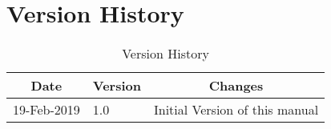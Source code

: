 \newpage
\thispagestyle{plain}
\section*{Version History}
\begin{table}[H]
\centering
	\begin{tabular}{| p{3cm} | p{2cm} | p{10cm} |}
	\multicolumn{1}{c}{\textbf{Date}} & \multicolumn{1}{c}{\textbf{Version}} & \multicolumn{1}{c}{\textbf{Changes}}\\
	\hline
	19-Feb-2019 & 1.0 & Initial Version of this manual \\
	\hline
	\end{tabular}
	\caption{Version History}
	\label{tab:version history}
\end{table}
\clearpage


\thispagestyle{plain}
\tableofcontents


